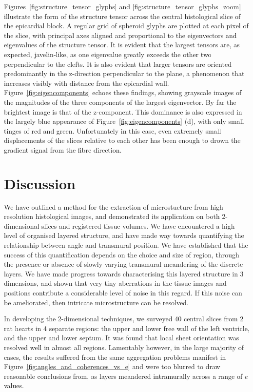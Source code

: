     Figures~\ref{fig:structure_tensor_glyphs} and \ref{fig:structure_tensor_glyphs_zoom} illustrate the form of the structure tensor across the central histological slice of the epicardial block. A regular grid of spheroid glyphs are plotted at each pixel of the slice, with principal axes aligned and proportional to the eigenvectors and eigenvalues of the structure tensor. It is evident that the largest tensors are, as expected, javelin-like, as one eigenvalue greatly exceeds the other two perpendicular to the clefts. It is also evident that larger tensors are oriented predominantly in the z-direction perpendicular to the plane, a phenomenon that increases visibly with distance from the epicardial wall. Figure~\ref{fig:eigencomponents} echoes these findings, showing grayscale images of the magnitudes of the three components of the largest eigenvector. By far the brightest image is that of the z-component. This dominance is also expressed in the largely blue appearance of Figure~\ref{fig:eigencomponents} (d), with only small tinges of red and green. Unfortunately in this case, even extremely small displacements of the slices relative to each other has been enough to drown the gradient signal from the fibre direction.
  

\section{Discussion} %
  We have outlined a method for the extraction of microstucture from high resolution histological images, and demonstrated its application on both 2-dimensional slices and registered tissue volumes. We have encountered a high level of organised layered structure, and have made way towards quantifying the relationship between angle and transmural position. We have established that the success of this quantification depends on the choice and size of region, through the presence or absence of slowly-varying transmural meandering of the discrete layers. We have made progress towards characterising this layered structure in 3 dimensions, and shown that very tiny aberrations in the tissue images and positions contribute a considerable level of noise in this regard. If this noise can be ameliorated, then intricate microstructure can be resolved.
  
  In developing the 2-dimensional techniques, we surveyed 40 central slices from 2 rat hearts in 4 separate regions: the upper and lower free wall of the left ventricle, and the upper and lower septum. It was found that local sheet orientation was resolved well in almost all regions. Lamentably however, in the large majority of cases, the results suffered from the same aggregation problems manifest in Figure~\ref{fig:angles_and_coherences_vs_e} and were too blurred to draw reasonable conclusions from, as layers meandered intramurally across a range of $e$ values.
  
